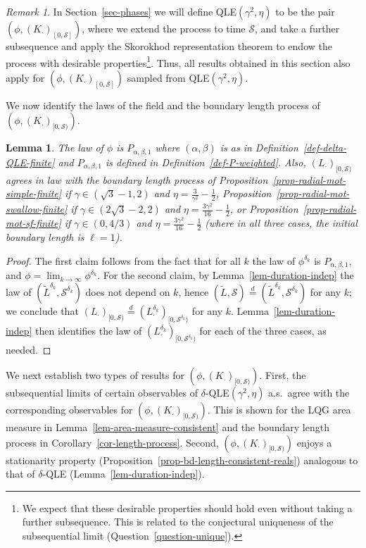 \documentclass[a4paper]{article}
\numberwithin{equation}{section}
\newcommand{\qduration}{\mathcal{S}}
\newtheorem{lemma}[theorem]{Lemma}
\theoremstyle{remark}
\newtheorem{remark}[theorem]{Remark}
\numberwithin{equation}{section}
\begin{document}
\begin{remark}
In Section~\ref{sec-phases} we will define QLE$(\gamma^2, \eta)$ to be the pair $(\phi, (K_\cdot)_{[0,\qduration]})$, where we extend the process to time $\qduration$, and take a further subsequence and apply the Skorokhod representation theorem to endow the process with desirable properties\footnote{We expect that these desirable properties should hold even without taking a further subsequence. This is related to the conjectural uniqueness of the subsequential limit (Question~\ref{question-unique}).}.
    Thus, all results obtained in this section also apply for $(\phi, (K_\cdot)_{[0,\qduration]})$ sampled from  QLE$(\gamma^2, \eta)$. 
\end{remark}

We now identify the laws of the field and the boundary length process of $(\phi, (K_\cdot)_{[0,\qduration)})$. 
\begin{lemma}\label{lem-qle-field-bdy-procress}
    The law of $\phi$ is $P_{\alpha, \beta, 1}$  where $(\alpha, \beta)$ is as in Definition~\ref{def-delta-QLE-finite} and $P_{\alpha, \beta, 1}$ is defined in Definition~\ref{def-P-weighted}. Also, $(L_\cdot)_{[0,\qduration)}$  agrees in law with the boundary length process of Proposition~\ref{prop-radial-mot-simple-finite} if $\gamma \in (\sqrt3 - 1,2)$ and $\eta = \frac3{\gamma^2} - \frac12$, Proposition~\ref{prop-radial-mot-swallow-finite} if $\gamma \in (2\sqrt3 - 2, 2)$ and $\eta = \frac{3\gamma^2}{16} - \frac12$, or  
    Proposition~\ref{prop-radial-mot-sf-finite} if $\gamma \in (0, 4/3)$ and $\eta = \frac{3\gamma^2}{16} - \frac12$ (where in all three cases, the initial boundary length is $\ell = 1$).
\end{lemma}
\begin{proof}
The first claim follows from the fact that for all $k$ the law of $\phi^{\delta_k}$ is $P_{\alpha, \beta, 1}$, and $\phi = \lim_{k \to \infty} \phi^{\delta_k}$. For the second claim, by Lemma~\ref{lem-duration-indep} the law of $(\tilde L^{\delta_k},  \qduration^{\delta_k})$ does not depend on $k$, hence $(\tilde L, \qduration) \stackrel d= (\tilde L^{\delta_k},  \qduration^{\delta_k}) $ for any $k$; we conclude that $(L_\cdot)_{[0,\qduration)} \stackrel d= (L_\cdot^{\delta_k})_{[0,\qduration^{\delta_k})}$ for any $k$. Lemma~\ref{lem-duration-indep} then identifies the law of  $(L_\cdot^{\delta_k})_{[0,\qduration^{\delta_k})}$ for each of the three cases, as needed. 
\end{proof}

We next establish two types of results for $(\phi, (K_\cdot)_{[0,\qduration)})$. First, the subsequential limits of certain observables of $\delta$-QLE$(\gamma^2, \eta)$ a.s.\ agree with the corresponding observables for $(\phi, (K_\cdot)_{[0,\qduration)})$. This is shown for the LQG area measure in Lemma~\ref{lem-area-measure-consistent} and the boundary length process in Corollary~\ref{cor-length-process}. Second, $(\phi, (K_\cdot)_{[0,\qduration)})$ enjoys a stationarity property (Proposition~\ref{prop-bd-length-consistent-reals}) analogous to that of $\delta$-QLE (Lemma~\ref{lem-duration-indep}). 
\end{document}
